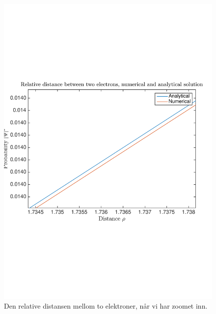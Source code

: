 \documentclass[norsk, 12pt]{article}
\theoremstyle{definition} \newtheorem{defi}{Definisjon}[subsection]
\theoremstyle{definition} \newtheorem{teo}{Teorem}[subsection]
\theoremstyle{definition} \newtheorem*{eks}{Eksempel}
\begin{document}
\begin{figure}[H]
\centering
\includegraphics[scale = 0.6, trim = 1cm 7cm 1cm 7cm]{rel_dist_num_anal.pdf}
\caption{Den relative distansen mellom to elektroner, når vi har zoomet inn.}
\label{fig:reldist}
\end{figure}
\end{document}
